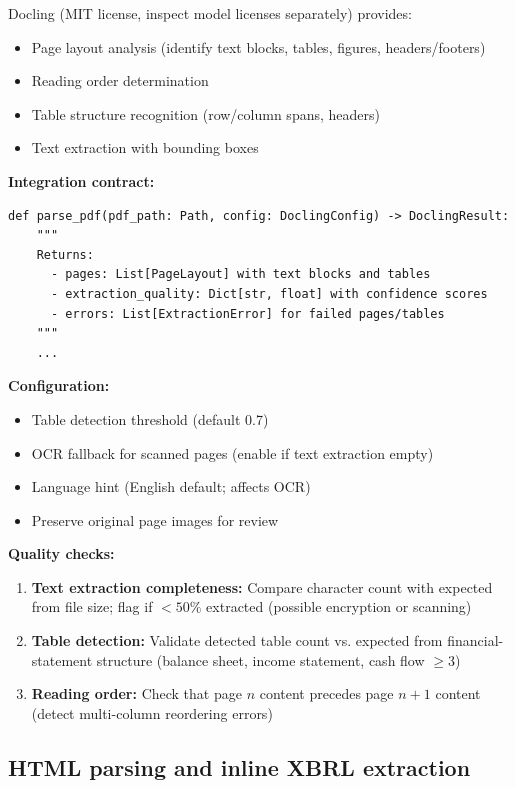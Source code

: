 Docling (MIT license, inspect model licenses separately) provides:
\begin{itemize}
\item Page layout analysis (identify text blocks, tables, figures, headers/footers)
\item Reading order determination
\item Table structure recognition (row/column spans, headers)
\item Text extraction with bounding boxes
\end{itemize}

\textbf{Integration contract:}

\begin{lstlisting}
def parse_pdf(pdf_path: Path, config: DoclingConfig) -> DoclingResult:
    """
    Returns:
      - pages: List[PageLayout] with text blocks and tables
      - extraction_quality: Dict[str, float] with confidence scores
      - errors: List[ExtractionError] for failed pages/tables
    """
    ...
\end{lstlisting}

\textbf{Configuration:}
\begin{itemize}
\item Table detection threshold (default 0.7)
\item OCR fallback for scanned pages (enable if text extraction empty)
\item Language hint (English default; affects OCR)
\item Preserve original page images for review
\end{itemize}

\textbf{Quality checks:}
\begin{enumerate}
\item \textbf{Text extraction completeness:} Compare character count with expected
  from file size; flag if $<50\%$ extracted (possible encryption or scanning)
\item \textbf{Table detection:} Validate detected table count vs. expected from
  financial-statement structure (balance sheet, income statement, cash flow $\geq 3$)
\item \textbf{Reading order:} Check that page $n$ content precedes page $n+1$
  content (detect multi-column reordering errors)
\end{enumerate}

\subsection{HTML parsing and inline XBRL extraction}

